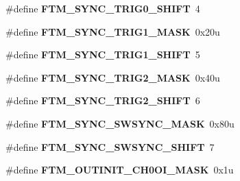 \begin{DoxyCompactItemize}
\item 
\#define {\bfseries F\+T\+M\+\_\+\+S\+Y\+N\+C\+\_\+\+T\+R\+I\+G0\+\_\+\+S\+H\+I\+FT}~4\hypertarget{group__FTM__Register__Masks_ga1b676aad473928dd52e5d757149ab445}{}\label{group__FTM__Register__Masks_ga1b676aad473928dd52e5d757149ab445}

\item 
\#define {\bfseries F\+T\+M\+\_\+\+S\+Y\+N\+C\+\_\+\+T\+R\+I\+G1\+\_\+\+M\+A\+SK}~0x20u\hypertarget{group__FTM__Register__Masks_gab2caa82ba7f028e7a696a8e02b7f87ac}{}\label{group__FTM__Register__Masks_gab2caa82ba7f028e7a696a8e02b7f87ac}

\item 
\#define {\bfseries F\+T\+M\+\_\+\+S\+Y\+N\+C\+\_\+\+T\+R\+I\+G1\+\_\+\+S\+H\+I\+FT}~5\hypertarget{group__FTM__Register__Masks_ga44401f020ce66143ee97582e21332fe9}{}\label{group__FTM__Register__Masks_ga44401f020ce66143ee97582e21332fe9}

\item 
\#define {\bfseries F\+T\+M\+\_\+\+S\+Y\+N\+C\+\_\+\+T\+R\+I\+G2\+\_\+\+M\+A\+SK}~0x40u\hypertarget{group__FTM__Register__Masks_gaf1b0377ca3de3fac73b014406084a05b}{}\label{group__FTM__Register__Masks_gaf1b0377ca3de3fac73b014406084a05b}

\item 
\#define {\bfseries F\+T\+M\+\_\+\+S\+Y\+N\+C\+\_\+\+T\+R\+I\+G2\+\_\+\+S\+H\+I\+FT}~6\hypertarget{group__FTM__Register__Masks_gafd88ca49160a6fb4bb24f6ed57180b87}{}\label{group__FTM__Register__Masks_gafd88ca49160a6fb4bb24f6ed57180b87}

\item 
\#define {\bfseries F\+T\+M\+\_\+\+S\+Y\+N\+C\+\_\+\+S\+W\+S\+Y\+N\+C\+\_\+\+M\+A\+SK}~0x80u\hypertarget{group__FTM__Register__Masks_gaa3cb833bf90ebaf61a187b421a956a30}{}\label{group__FTM__Register__Masks_gaa3cb833bf90ebaf61a187b421a956a30}

\item 
\#define {\bfseries F\+T\+M\+\_\+\+S\+Y\+N\+C\+\_\+\+S\+W\+S\+Y\+N\+C\+\_\+\+S\+H\+I\+FT}~7\hypertarget{group__FTM__Register__Masks_ga0ff121b844150b34a80e0d43d851c7a1}{}\label{group__FTM__Register__Masks_ga0ff121b844150b34a80e0d43d851c7a1}

\item 
\#define {\bfseries F\+T\+M\+\_\+\+O\+U\+T\+I\+N\+I\+T\+\_\+\+C\+H0\+O\+I\+\_\+\+M\+A\+SK}~0x1u\hypertarget{group__FTM__Register__Masks_ga25049f81cfbb792f293e74d623d1a945}{}\label{group__FTM__Register__Masks_ga25049f81cfbb792f293e74d623d1a945}


\end{DoxyCompactItemize}
